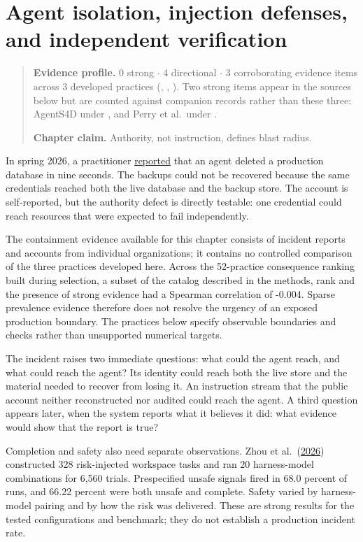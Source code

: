 \chapter{Agent isolation, injection defenses, and independent verification}
\label{ch08-isolation-injection-independent-verification}
\begin{quote}
\textbf{Evidence profile.} 0 strong \(\cdot\) 4 directional \(\cdot\) 3 corroborating evidence items across 3 developed practices (, , ). Two strong items appear in the sources below but are counted against companion records rather than these three: AgentS4D under , and Perry et al.~under .

\textbf{Chapter claim.} Authority, not instruction, defines blast radius.
\end{quote}

In spring 2026, a practitioner \href{https://www.reddit.com/r/devops/comments/1tbbls4/}{reported} that an agent deleted a production database in nine seconds. The backups could not be recovered because the same credentials reached both the live database and the backup store. The account is self-reported, but the authority defect is directly testable: one credential could reach resources that were expected to fail independently.

The containment evidence available for this chapter consists of incident reports and accounts from individual organizations; it contains no controlled comparison of the three practices developed here. Across the 52-practice consequence ranking built during selection, a subset of the catalog described in the methods, rank and the presence of strong evidence had a Spearman correlation of -0.004. Sparse prevalence evidence therefore does not resolve the urgency of an exposed production boundary. The practices below specify observable boundaries and checks rather than unsupported numerical targets.

The incident raises two immediate questions: what could the agent reach, and what could reach the agent? Its identity could reach both the live store and the material needed to recover from losing it. An instruction stream that the public account neither reconstructed nor audited could reach the agent. A third question appears later, when the system reports what it believes it did: what evidence would show that the report is true?

Completion and safety also need separate observations. Zhou et al.~(\href{https://arxiv.org/abs/2607.27294}{2026}) constructed 328 risk-injected workspace tasks and ran 20 harness-model combinations for 6,560 trials. Prespecified unsafe signals fired in 68.0 percent of runs, and 66.22 percent were both unsafe and complete. Safety varied by harness-model pairing and by how the risk was delivered. These are strong results for the tested configurations and benchmark; they do not establish a production incident rate.

